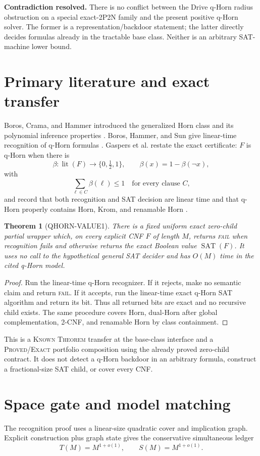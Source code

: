 \documentclass[11pt]{article}
\newtheorem{theorem}{Theorem}
\newcommand{\SAT}{\operatorname{SAT}}
\begin{document}
\textbf{Contradiction resolved.}  There is no conflict between the Drive
q-Horn radius obstruction on a special exact-2P2N family and the present
positive q-Horn solver.  The former is a representation/backdoor statement;
the latter directly decides formulas already in the tractable base class.
Neither is an arbitrary SAT-machine lower bound.

\section{Primary literature and exact transfer}
Boros, Crama, and Hammer introduced the generalized Horn class and its
polynomial inference properties \cite{boros1990qh_inference}.  Boros,
Hammer, and Sun give linear-time recognition of q-Horn formulas
\cite{boros1994qhorn}.  Gaspers et al. restate the exact certificate:
$F$ is q-Horn when there is
\[
 \beta:\operatorname{lit}(F)\to\{0,\tfrac12,1\},\qquad
 \beta(x)=1-\beta(\neg x),
\]
with
\[
 \sum_{\ell\in C}\beta(\ell)\le1
 \quad\text{for every clause }C,
\]
and record that both recognition and SAT decision are linear time and that
q-Horn properly contains Horn, Krom, and renamable Horn
\cite{gaspers2013qhorn}.

\begin{theorem}[QHORN-VALUE1]
There is a fixed uniform exact zero-child partial wrapper which, on every
explicit CNF $F$ of length $M$, returns \textsc{fail} when recognition fails
and otherwise returns the exact Boolean value $\SAT(F)$.  It uses no call to
the hypothetical general SAT decider and has $O(M)$ time in the cited q-Horn
model.
\end{theorem}
\begin{proof}
Run the linear-time q-Horn recognizer.  If it rejects, make no semantic claim
and return \textsc{fail}.  If it accepts, run the linear-time exact q-Horn
SAT algorithm and return its bit.  Thus all returned bits are exact and no
recursive child exists.  The same procedure covers Horn, dual-Horn after
global complementation, 2-CNF, and renamable Horn by class containment.
\end{proof}

This is a \textsc{Known Theorem} transfer at the base-class interface and a
\textsc{Proved/Exact} portfolio composition using the already proved
zero-child contract.  It does not detect a q-Horn backdoor in an arbitrary
formula, construct a fractional-size SAT child, or cover every CNF.

\section{Space gate and model matching}
The recognition proof uses a linear-size quadratic cover and implication
graph.  Explicit construction plus graph state gives the conservative
simultaneous ledger
\[
 T(M)=M^{1+o(1)},\qquad S(M)=M^{1+o(1)}.
\]
\end{document}
